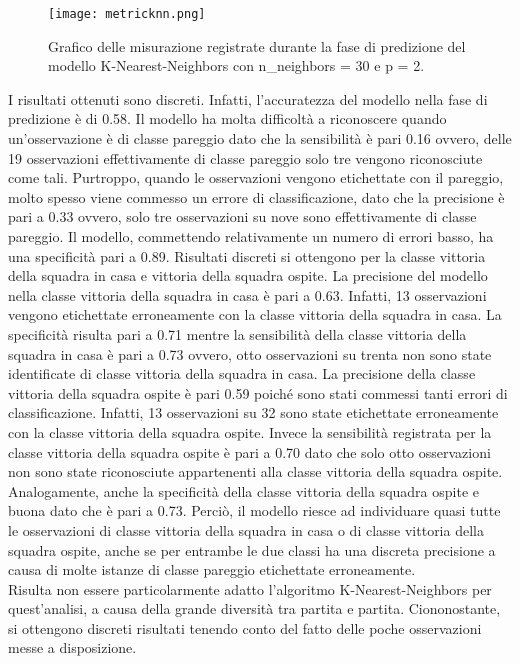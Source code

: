 \begin{figure}[h]
	\begin{center}
		\texttt{[image: metricknn.png]}
		\caption{Grafico delle misurazione registrate durante la fase di predizione del modello K-Nearest-Neighbors con\textsf{ n\_neighbors} = 30 e \textsf{p} = 2.
		} 
		\label{fig:knnmetrics}
	\end{center}
\end{figure}
I risultati ottenuti sono discreti. Infatti, l'accuratezza del modello nella fase di predizione è di 0.58. Il modello ha molta difficoltà a riconoscere quando un’osservazione è di classe pareggio dato che la sensibilità è pari 0.16 ovvero, delle 19 osservazioni effettivamente di classe pareggio solo tre vengono riconosciute come tali. Purtroppo, quando le osservazioni vengono etichettate con il pareggio, molto spesso viene commesso un errore di classificazione, dato che la precisione è pari a 0.33 ovvero, solo tre osservazioni su nove %
sono effettivamente di classe pareggio. Il modello, commettendo relativamente un numero di errori basso, ha una specificità pari a 0.89. Risultati discreti si ottengono per la classe vittoria della squadra in casa e vittoria della squadra ospite. La precisione del modello nella classe vittoria della squadra in casa è pari a 0.63. Infatti, 13 osservazioni vengono etichettate erroneamente con la classe vittoria della squadra in casa. La specificità risulta pari a 0.71 mentre la sensibilità della classe vittoria della squadra in casa è pari a 0.73 ovvero, otto osservazioni su trenta non sono state identificate di classe vittoria della squadra in casa. La precisione della classe vittoria della squadra ospite è pari 0.59 poiché sono stati commessi tanti errori di classificazione. Infatti, 13 osservazioni su 32 sono state etichettate erroneamente con la classe vittoria della squadra ospite. Invece la sensibilità registrata per la classe vittoria della squadra ospite è pari a 0.70 dato che solo otto osservazioni non sono state riconosciute appartenenti alla classe vittoria della squadra ospite. Analogamente, anche la specificità della classe vittoria della squadra ospite e buona dato che è pari a 0.73. Perciò, il modello riesce ad individuare quasi tutte le osservazioni di classe vittoria della squadra in casa o di classe vittoria della squadra ospite, anche se per entrambe le due classi ha una discreta precisione a causa di molte istanze di classe pareggio etichettate erroneamente.\\
Risulta non essere particolarmente adatto l'algoritmo K-Nearest-Neighbors per quest'analisi, a causa della grande diversità tra partita e partita. Ciononostante, si ottengono discreti risultati tenendo conto del fatto delle poche osservazioni messe a disposizione.
